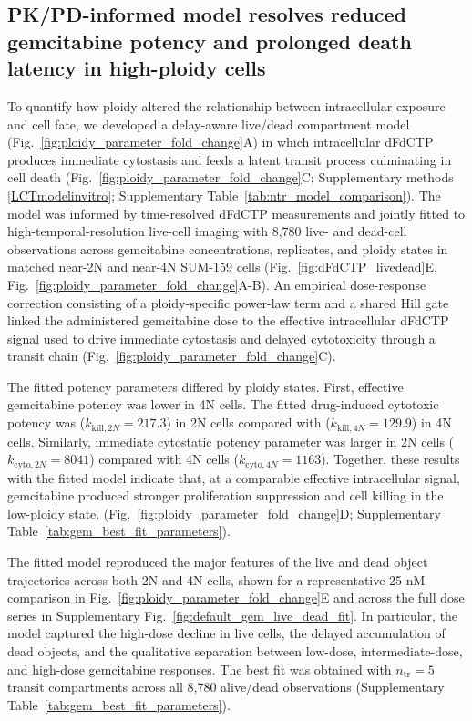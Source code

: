 \documentclass[11pt,notitlepage]{article}
\begin{document}
\subsection*{PK/PD-informed model resolves reduced gemcitabine potency and prolonged death latency in high-ploidy cells}

To quantify how ploidy altered the relationship between intracellular exposure and cell fate, we developed a delay-aware live/dead compartment model (Fig.~\ref{fig:ploidy_parameter_fold_change}A) in which intracellular dFdCTP produces immediate cytostasis and feeds a latent transit process culminating in cell death (Fig.~\ref{fig:ploidy_parameter_fold_change}C; Supplementary methods \ref{LCTmodelinvitro}; Supplementary Table~\ref{tab:ntr_model_comparison}). The model was informed by time-resolved dFdCTP measurements and jointly fitted to high-temporal-resolution live-cell imaging with 8,780 live- and dead-cell observations across gemcitabine concentrations, replicates, and ploidy states in matched near-2N and near-4N SUM-159 cells (Fig.~\ref{fig:dFdCTP_livedead}E, Fig.~\ref{fig:ploidy_parameter_fold_change}A-B). An empirical dose-response correction consisting of a ploidy-specific power-law term and a shared Hill gate linked the administered gemcitabine dose to the effective intracellular dFdCTP signal used to drive immediate cytostasis and delayed cytotoxicity through a transit chain (Fig.~\ref{fig:ploidy_parameter_fold_change}C).

The fitted potency parameters differed by ploidy states. First, effective gemcitabine potency was lower in 4N cells. The fitted drug-induced cytotoxic potency was (\(k_{\mathrm{kill},2N}=217.3\)) in 2N cells compared with (\(k_{\mathrm{kill},4N}=129.9\)) in 4N cells. Similarly, immediate cytostatic potency parameter was larger in 2N cells (\(k_{\mathrm{cyto},2N}=8041\)) compared with 4N cells (\(k_{\mathrm{cyto},4N}=1163\)). Together, these results with the fitted model indicate that, at a comparable effective intracellular signal, gemcitabine produced stronger proliferation suppression and cell killing in the low-ploidy state. (Fig.~\ref{fig:ploidy_parameter_fold_change}D; Supplementary Table~\ref{tab:gem_best_fit_parameters}).

The fitted model reproduced the major features of the live and dead object trajectories across both 2N and 4N cells, shown for a representative 25 nM comparison in Fig.~\ref{fig:ploidy_parameter_fold_change}E and across the full dose series in Supplementary Fig.~\ref{fig:default_gem_live_dead_fit}. In particular, the model captured the high-dose decline in live cells, the delayed accumulation of dead objects, and the qualitative separation between low-dose, intermediate-dose, and high-dose gemcitabine responses. The best fit was obtained with \(n_{\mathrm{tr}}=5\) transit compartments across all 8,780 alive/dead observations (Supplementary Table~\ref{tab:gem_best_fit_parameters}). 
\end{document}
